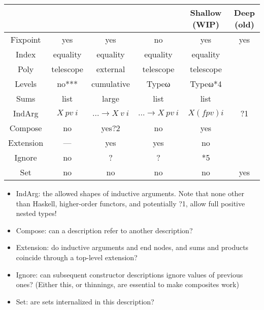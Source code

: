 \begin{tabular}{c | c c c c c}
             & \cite{sijsling} & \cite{effectfully} & \cite{practgen} & Shallow (WIP) & Deep (old)    \\
    \hline   
    Fixpoint & yes             & yes                & no              & yes       & yes     \\
    Index    & equality        & equality           & equality        & equality  &         \\
    Poly     & telescope       & external           & telescope       & telescope &         \\
    Levels   & no***           & cumulative         & Typeω           & Typeω*4   &         \\
    Sums     & list            & large              & list            & list      &         \\
    IndArg   & $X\ pv\ i$      & $\dots\to X\ v\ i$ & $\dots\to X\ pv\ i$ & $X (f pv) i$ & ?1 \\
    Compose  & no              & yes?2              & no              & yes       &         \\
    Extension& —               & yes                & yes             & no        &         \\
    Ignore   & no              & ?                  & ?               & *5        &         \\
    Set      & no              & no                 & no              & no        & yes     \\
\end{tabular}



\begin{itemize}
    \item IndArg: the allowed shapes of inductive arguments. Note that none other than Haskell, higher-order functors, and potentially ?1, allow full positive nested types!
    \item Compose: can a description refer to another description?
    \item Extension: do inductive arguments and end nodes, and sums and products coincide through a top-level extension?
    \item Ignore: can subsequent constructor descriptions ignore values of previous ones? (Either this, or thinnings, are essential to make composites work)
    \item Set: are sets internalized in this description?
\end{itemize}

